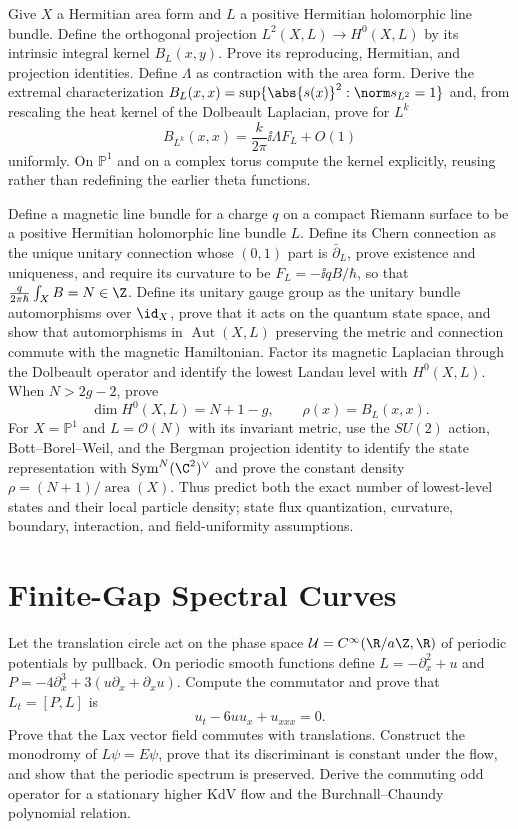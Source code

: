 \begin{exercise}
Give $X$ a Hermitian area form and $L$ a positive Hermitian holomorphic line
bundle.  Define the orthogonal projection
$L^2(X,L)\to H^0(X,L)$ by its intrinsic integral kernel $B_L(x,y)$.
Prove its reproducing, Hermitian, and projection identities.  Define
$\Lambda$ as contraction with the area form.  Derive the
extremal characterization
$B_L(x,x)=\sup\{\abs{s(x)}^2:\norm s_{L^2}=1\}$ and, from rescaling the heat
kernel of the Dolbeault Laplacian, prove for $L^k$
\[
 B_{L^k}(x,x)=\frac{k}{2\pi}\ii\Lambda F_L+O(1)
\]
uniformly.  On $\mathbb P^1$ and on a complex torus compute the kernel
explicitly, reusing rather than redefining the earlier theta functions.
\end{exercise}

\begin{exercise}
Define a magnetic line bundle for a charge $q$ on a compact Riemann surface
to be a positive Hermitian holomorphic line bundle $L$.  Define its Chern
connection as the unique unitary connection whose $(0,1)$ part is
$\bar\partial_L$, prove existence and uniqueness, and require its curvature
to be $F_L=-\ii qB/\hbar$, so that
$\frac{q}{2\pi\hbar}\int_XB=N\in\Z$.  Define its unitary gauge group as the
unitary bundle automorphisms over $\id_X$, prove that it acts on the quantum
state space, and show that automorphisms in
$\operatorname{Aut}(X,L)$ preserving the metric and connection commute with
the magnetic Hamiltonian.  Factor its magnetic
Laplacian through the Dolbeault operator and identify the lowest Landau level
with $H^0(X,L)$.  When $N>2g-2$, prove
\[
 \dim H^0(X,L)=N+1-g,\qquad
 \rho(x)=B_L(x,x).
\]
For $X=\mathbb P^1$ and $L=\mathcal O(N)$ with its invariant metric, use the
$SU(2)$ action, Bott--Borel--Weil, and the Bergman projection identity to
identify the state representation with
$\operatorname{Sym}^N(\C^2)^\vee$ and prove the constant density
$\rho=(N+1)/\operatorname{area}(X)$.  Thus predict both the exact number of
lowest-level states and their local particle density; state flux
quantization, curvature, boundary, interaction, and field-uniformity
assumptions.
\end{exercise}

\section{Finite-Gap Spectral Curves}

\begin{exercise}
Let the translation circle act on the phase space
$\mathcal U=C^\infty(\R/a\Z,\R)$ of periodic potentials by pullback.  On
periodic smooth functions define
$L=-\partial_x^2+u$ and
$P=-4\partial_x^3+3(u\partial_x+\partial_xu)$.  Compute the commutator and
prove that $L_t=[P,L]$ is
\[
 u_t-6uu_x+u_{xxx}=0.
\]
Prove that the Lax vector field commutes with translations.  Construct the
monodromy of $L\psi=E\psi$, prove that its discriminant is
constant under the flow, and show that the periodic spectrum is preserved.
Derive the commuting odd operator for a stationary higher KdV flow and the
Burchnall--Chaundy polynomial relation.
\end{exercise}

